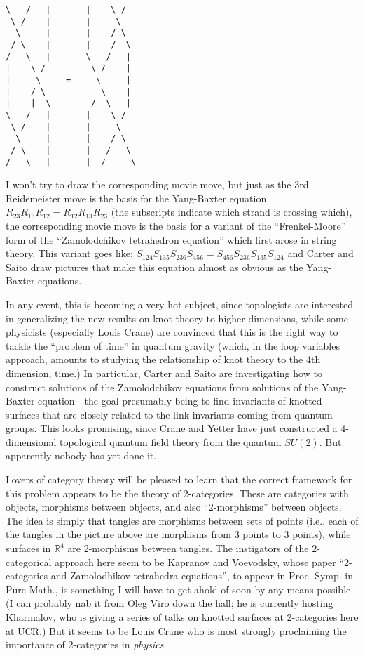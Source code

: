 \documentclass{article}
\begin{document}
\begin{verbatim}
\   /   |       |    \ /
 \ /    |       |     \
  \     |       |    / \
 / \    |       |    /  \
/   \   |       \   /   |
|    \ /         \ /    |
|     \     =     \     |
|    / \           \    |
|    |  \        /  \   |
\   /   |       |    \ /
 \ /    |       |     \
  \     |       |    / \
 / \    |       |   /   \
/   \   |       |  /     \
\end{verbatim}

I won't try to draw the corresponding movie move, but just as the 3rd
Reidemeister move is the basis for the Yang-Baxter equation
\(R_{23}R_{13}R_{12} = R_{12}R_{13}R_{23}\) (the subscripts indicate
which strand is crossing which), the corresponding movie move is the
basis for a variant of the ``Frenkel-Moore'' form of the ``Zamolodchikov
tetrahedron equation'' which first arose in string theory. This variant
goes like:
\(S_{124}S_{135}S_{236}S_{456} = S_{456}S_{236}S_{135}S_{124}\) and
Carter and Saito draw pictures that make this equation almost as obvious
as the Yang-Baxter equations.

In any event, this is becoming a very hot subject, since topologists are
interested in generalizing the new results on knot theory to higher
dimensions, while some physicists (especially Louis Crane) are convinced
that this is the right way to tackle the ``problem of time'' in quantum
gravity (which, in the loop variables approach, amounts to studying the
relationship of knot theory to the 4th dimension, time.) In particular,
Carter and Saito are investigating how to construct solutions of the
Zamolodchikov equations from solutions of the Yang-Baxter equation - the
goal presumably being to find invariants of knotted surfaces that are
closely related to the link invariants coming from quantum groups. This
looks promising, since Crane and Yetter have just constructed a
4-dimensional topological quantum field theory from the quantum
\(SU(2)\). But apparently nobody has yet done it.

Lovers of category theory will be pleased to learn that the correct
framework for this problem appears to be the theory of 2-categories.
These are categories with objects, morphisms between objects, and also
``2-morphisms'' between objects. The idea is simply that tangles are
morphisms between sets of points (i.e., each of the tangles in the
picture above are morphisms from 3 points to 3 points), while surfaces
in \(\mathbb{R}^4\) are 2-morphisms between tangles. The instigators of
the 2-categorical approach here seem to be Kapranov and Voevodsky, whose
paper ``2-categories and Zamolodhikov tetrahedra equations'', to appear
in Proc. Symp. in Pure Math., is something I will have to get ahold of
soon by any means possible (I can probably nab it from Oleg Viro down
the hall; he is currently hosting Kharmalov, who is giving a series of
talks on knotted surfaces at 2-categories here at UCR.) But it seems to
be Louis Crane who is most strongly proclaiming the importance of
2-categories in \emph{physics}.
\end{document}
